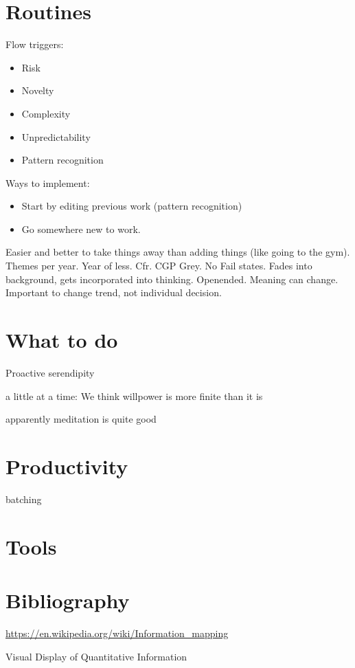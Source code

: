 \documentclass{report}
\begin{document}
\chapter{Routines}
Flow triggers:
\begin{itemize}
\item Risk
\item Novelty
\item Complexity
\item Unpredictability
\item Pattern recognition
\end{itemize}
Ways to implement:
\begin{itemize}
\item Start by editing previous work (pattern recognition)
\item Go somewhere new to work.
\end{itemize}

Easier and better to take things away than adding things (like going to the gym).
Themes per year. Year of less. Cfr. CGP Grey. No Fail states. Fades into background, gets incorporated into thinking. Openended. Meaning can change. Important to change trend, not individual decision.

\chapter{What to do}
Proactive serendipity

a little at a time: We think willpower is more finite than it is

apparently meditation is quite good

\chapter{Productivity}
batching

\appendix

\chapter{Tools}

\chapter{Bibliography}

\url{https://en.wikipedia.org/wiki/Information_mapping}

Visual Display of Quantitative Information
\end{document}
